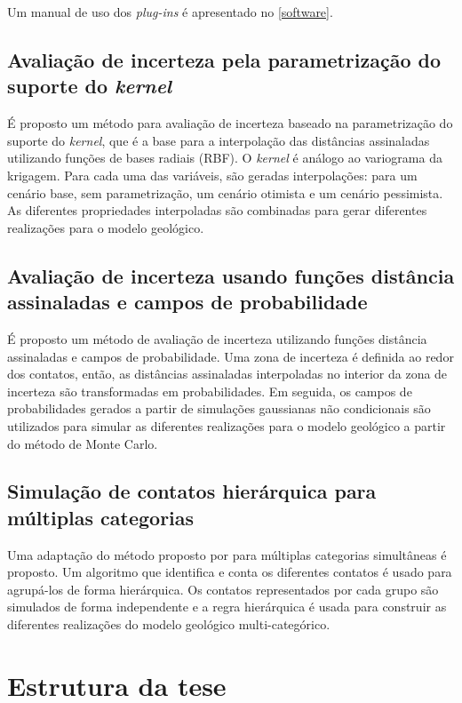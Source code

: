 Um manual de uso dos \textit{plug-ins} é apresentado no \autoref{software}. 

\subsection{Avaliação de incerteza pela parametrização do suporte do \textit{kernel}}

É proposto um método para avaliação de incerteza baseado na parametrização do suporte do \textit{kernel}, que é a base para a interpolação das distâncias assinaladas utilizando funções de bases radiais (RBF). O \textit{kernel} é análogo ao variograma da krigagem. Para cada uma das variáveis, são geradas interpolações: para um cenário base, sem parametrização, um cenário otimista e um cenário pessimista. As diferentes propriedades interpoladas são combinadas para gerar diferentes realizações para o modelo geológico.  

\subsection{Avaliação de incerteza usando funções distância assinaladas e campos de probabilidade}

É proposto um método de avaliação de incerteza utilizando funções distância assinaladas e campos de probabilidade. Uma zona de incerteza é definida ao redor dos contatos, então, as distâncias assinaladas interpoladas no interior da zona de incerteza são transformadas em probabilidades. Em seguida, os campos de probabilidades gerados a partir de simulações gaussianas não condicionais são utilizados para simular as diferentes realizações para o modelo geológico a partir do método de Monte Carlo.

\subsection{Simulação de contatos hierárquica para múltiplas categorias}

Uma adaptação do método proposto por  para múltiplas categorias simultâneas é proposto. Um algoritmo que identifica e conta os diferentes contatos é usado para agrupá-los de forma hierárquica. Os contatos representados por cada grupo são simulados de forma independente e a regra hierárquica é usada para construir as diferentes realizações do modelo geológico multi-categórico. 

\section{Estrutura da tese}

